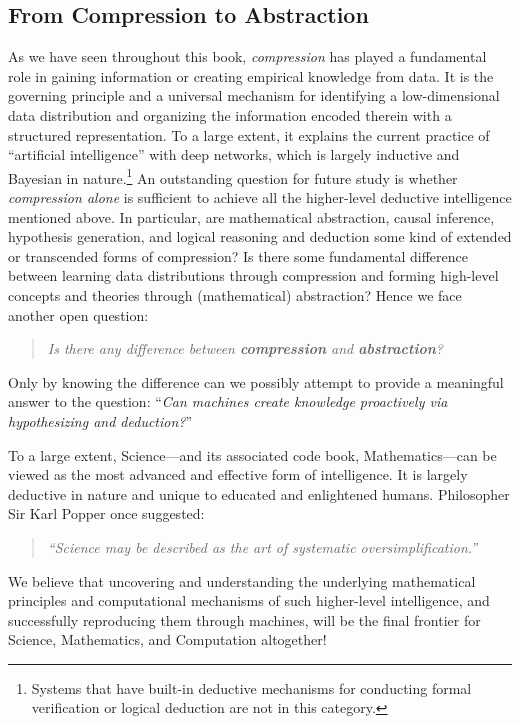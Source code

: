 \documentclass[../../book-main.tex]{subfiles}
\begin{document}
\subsection{From Compression to Abstraction}
As we have seen throughout this book, \textit{compression} has played
a fundamental role in gaining information or creating empirical knowledge from data. 
It is the governing principle and a universal mechanism for identifying a
low-dimensional data distribution and organizing the information encoded therein 
with a structured representation. To a large extent, it explains the current practice 
of ``artificial intelligence'' with deep networks, which is largely inductive 
and Bayesian in nature.\footnote{Systems that have built-in deductive mechanisms 
for conducting formal verification or logical deduction are not in this category.} 
An outstanding question for future study is whether \textit{compression alone} is 
sufficient to achieve all the higher-level deductive intelligence mentioned above.
In particular, are mathematical abstraction, causal inference, hypothesis
generation, and logical reasoning and deduction some kind of extended or
transcended forms of compression? Is there some fundamental difference between 
learning data distributions through compression and forming high-level concepts and 
theories through (mathematical) abstraction? Hence we face another open question:
\begin{quote}
    \centering
    \textit{Is there any difference between \textbf{compression} and
    \textbf{abstraction}?}
\end{quote}
Only by knowing the difference can we possibly attempt to provide a meaningful 
answer to the question: ``\textit{Can machines create knowledge proactively 
via hypothesizing and deduction?}''

To a large extent, Science---and its associated code book,
Mathematics---can be viewed as the most advanced and effective form of
intelligence. It is largely deductive in nature and unique to educated and 
enlightened humans. Philosopher Sir Karl Popper once suggested:
\begin{quote}
    \centering
    \textit{``Science may be described as the art of systematic
    oversimplification.''}
\end{quote}
We believe that uncovering and understanding the underlying mathematical 
principles and computational mechanisms of such higher-level intelligence, 
and successfully reproducing them through machines, will be the final frontier 
for Science, Mathematics, and Computation altogether!
\end{document}
